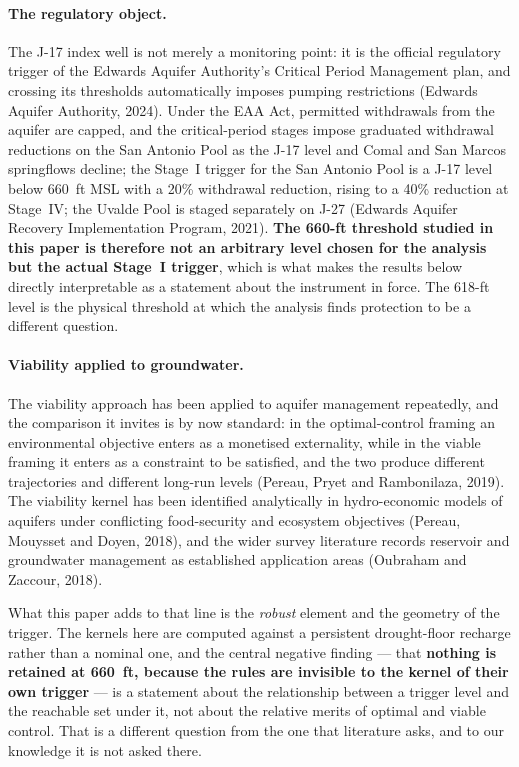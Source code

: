 \documentclass[11pt]{article}
\begin{document}
\paragraph{The regulatory object.} The J-17 index well is not merely a monitoring point: it
is the official regulatory trigger of the Edwards Aquifer Authority's Critical Period
Management plan, and crossing its thresholds automatically imposes pumping restrictions
(Edwards Aquifer Authority, 2024). Under the EAA Act, permitted withdrawals from the aquifer
are capped, and the critical-period stages impose graduated withdrawal reductions on the San
Antonio Pool as the J-17 level and Comal and San Marcos springflows decline; the Stage~I
trigger for the San Antonio Pool is a J-17 level below 660~ft MSL with a 20\% withdrawal
reduction, rising to a 40\% reduction at Stage~IV; the Uvalde Pool is staged separately on
J-27 (Edwards Aquifer Recovery Implementation Program, 2021). \textbf{The 660-ft threshold
studied in this paper is therefore not an arbitrary level chosen for the analysis but the
actual Stage~I trigger}, which is what makes the results below directly interpretable as a
statement about the instrument in force. The 618-ft level is the physical threshold at which
the analysis finds protection to be a different question.

\paragraph{Viability applied to groundwater.} The viability approach has been applied to
aquifer management repeatedly, and the comparison it invites is by now standard: in the
optimal-control framing an environmental objective enters as a monetised externality, while
in the viable framing it enters as a constraint to be satisfied, and the two produce
different trajectories and different long-run levels (Pereau, Pryet and Rambonilaza, 2019).
The viability kernel has been identified analytically in hydro-economic models of aquifers
under conflicting food-security and ecosystem objectives (Pereau, Mouysset and Doyen, 2018),
and the wider survey literature records reservoir and groundwater management as established
application areas (Oubraham and Zaccour, 2018).

What this paper adds to that line is the \emph{robust} element and the geometry of the
trigger. The kernels here are computed against a persistent drought-floor recharge rather
than a nominal one, and the central negative finding --- that \textbf{nothing is retained at
660~ft, because the rules are invisible to the kernel of their own trigger} --- is a
statement about the relationship between a trigger level and the reachable set under it, not
about the relative merits of optimal and viable control. That is a different question from
the one that literature asks, and to our knowledge it is not asked there.
\end{document}
